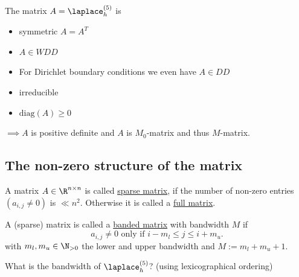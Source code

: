 \begin{summary}
\label{thm:summarymatrices}
The matrix $A = \laplace_{h}^{(5)}$ is 
\begin{itemize}
	\item symmetric $A = A^{T}$
	\item $A \in WDD$
	\item For Dirichlet boundary conditions we even have $A \in DD$
	\item irreducible
	\item $\text{diag}(A) \geq 0$
\end{itemize}
	$\implies A$ is positive definite and $A$ is $M_0$-matrix and thus $M$-matrix.
\end{summary}

\subsection{The non-zero structure of the matrix}%
\label{sec non-zero structure of the matrix}

A matrix $A \in \R^{n \times n}$ is called \underline{sparse matrix}, if the number of non-zero entries $(a_{i,j}\neq 0)$ is $\ll n^2$. Otherwise it is called a \underline{full matrix}. 

\begin{definition}
\label{thm:sparsetypes}
A (sparse) matrix is called a \underline{banded matrix}  with bandwidth $M$ if
\[
a_{i,j}\neq 0 \text{ only if } i-m_{l} \leq j \leq i + m_{u}
.\] 
with $m_{l},m_{u} \in \N_{>0}$ the lower and upper bandwidth and $M:=m_{l} + m_{u} + 1$.
\end{definition}

What is the bandwidth of $\laplace_{h}^{(5)}$? (using lexicographical ordering)

